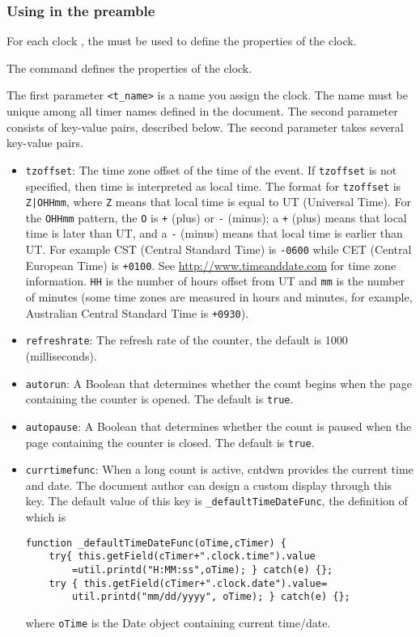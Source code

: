 \documentclass{article}
\begin{document}
\subsubsection{Using \texorpdfstring{\protect{}}{}
in the preamble}

For each clock , the  must be used to
define the properties of the clock.
\begin{dCmd*}{.6\linewidth}
\end{dCmd*}
\CmdDescription The command defines the properties of the clock.

\PD The first parameter \texttt{<t\_name>} is a name you assign the clock. The
name must be unique among all timer names defined in the document. The
second parameter consists of key-value pairs, described below.
\KVP The second parameter takes several key-value pairs.
\begin{itemize}
    \item \texttt{tzoffset}: The time zone offset of the time of the
    event. If \texttt{tzoffset} is not specified, then time is interpreted
    as local time.  The format for \texttt{tzoffset} is \texttt{Z|OHHmm},
    where \texttt{Z} means that local time is equal to UT (Universal
    Time). For the \texttt{OHHmm} pattern, the \texttt{O} is \texttt{+} (plus) or
    \texttt{-} (minus); a \texttt{+} (plus) means that local time is later than
    UT, and a \texttt{-} (minus) means that local time is earlier than UT. For
    example CST (Central Standard Time) is \texttt{-0600} while CET (Central European Time) is
    \texttt{+0100}. See \url{http://www.timeanddate.com} for time zone
    information. \texttt{HH} is the number of hours offset from UT and \texttt{mm} is the
    number of minutes (some time zones are measured in hours and minutes,
    for example, Australian Central Standard Time is \texttt{+0930}).
    \item \texttt{refreshrate}: The refresh rate of the counter, the
    default is 1000 (milliseconds).
    \item \texttt{autorun}: A Boolean that determines whether the count
    begins when the page containing the counter is opened. The default is
    \texttt{true}.
    \item \texttt{autopause}: A Boolean that determines whether the count
    is paused when the page containing the counter is closed. The default is
    \texttt{true}.
    \item \texttt{currtimefunc}: When a long count is active, \textsf{cntdwn}
    provides the current time and date.  The document author can design
    a custom display through this key. The default value of this key is
    \texttt{\_defaultTimeDateFunc}, the definition of which is
\begin{verbatim}
function _defaultTimeDateFunc(oTime,cTimer) {
    try{ this.getField(cTimer+".clock.time").value
        =util.printd("H:MM:ss",oTime); } catch(e) {};
    try { this.getField(cTimer+".clock.date").value=
        util.printd("mm/dd/yyyy", oTime); } catch(e) {};
\end{verbatim}
where \texttt{oTime} is the Date object containing current time/date.
\end{itemize}
\end{document}
